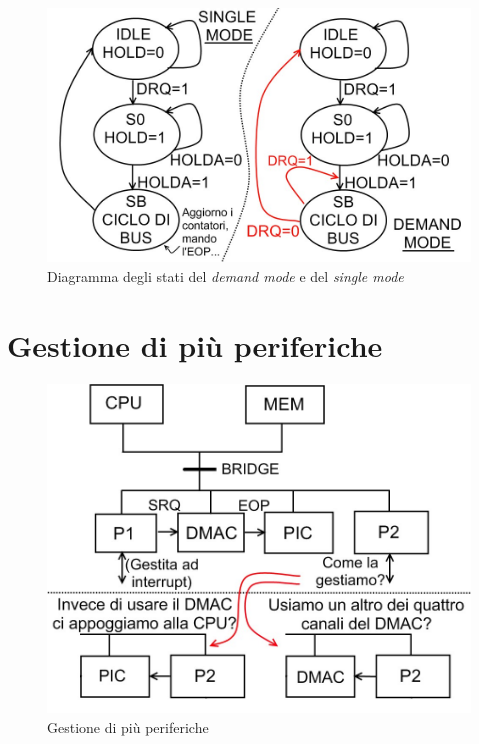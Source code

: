 \begin{figure}[!h]
\centering
\includegraphics[width=0.75\columnwidth]{img/DDSdemandsingle}
\caption{Diagramma degli stati del \textit{demand mode} e del \textit{single mode}}
\label{fig:DDSdemandsingle}
\end{figure}

\section{Gestione di più periferiche}
\label{sec:gestionePiuPeriferiche}

\begin{figure}[!h]
\centering
\includegraphics[width=0.75\columnwidth]{img/secondaPeriferica}
\caption{Gestione di più periferiche}
\label{fig:secondaPeriferica}
\end{figure}

